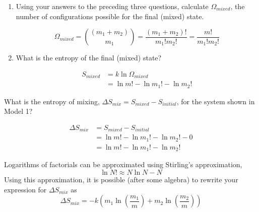 \begin{activity}
\begin{ctqs}
\begin{enumerate}
				\item Using your answers to the preceding three questions, calculate $\Omega_{mixed}$, the number of configurations possible for the final (mixed) state.
				
					\begin{solution}[1in]
						\begin{equation*}
							\Omega_{mixed} = {(m_1+m_2) \choose m_1} = \frac{(m_1+m_2)!}{m_1! m_2!} = \frac{m!}{m_1! m_2!}
						\end{equation*}
					\end{solution}
					
				\item What is the entropy of the final (mixed) state?
				
					\begin{solution}[1in]
						\begin{align*}
							S_{mixed} &= k \ln \Omega_{mixed}\\
							&= \ln m! - \ln m_1! - \ln m_2!
						\end{align*}
					\end{solution}
				
				
			\end{enumerate}
		\question What is the entropy of mixing, $\Delta S_{mix} = S_{mixed} - S_{initial}$, for the system shown in Model 1?
				
					\begin{solution}[1in]
						\begin{align*}
							\Delta S_{mix} &= S_{mixed} - S_{initial}\\
							 &= \ln m! - \ln m_1! - \ln m_2! - 0 \\
							 &= \ln m! - \ln m_1! - \ln m_2!
						\end{align*}
					\end{solution}
\end{ctqs}

\begin{infobox}
	Logarithms of factorials can be approximated using Stirling's approximation,
	\begin{equation*}
		\ln N! \approx N \ln N - N \label{eqn:stirling}
	\end{equation*}
	Using this approximation, it is possible (after some algebra) to rewrite your expression for $\Delta S_{mix}$ as
	\begin{equation*}
		\Delta S_{mix} = -k\left(m_1 \ln\left(\frac{m_1}{m}\right) + m_2 \ln\left(\frac{m_2}{m}\right) \right)
	\end{equation*}
\end{infobox}


\end{activity}

